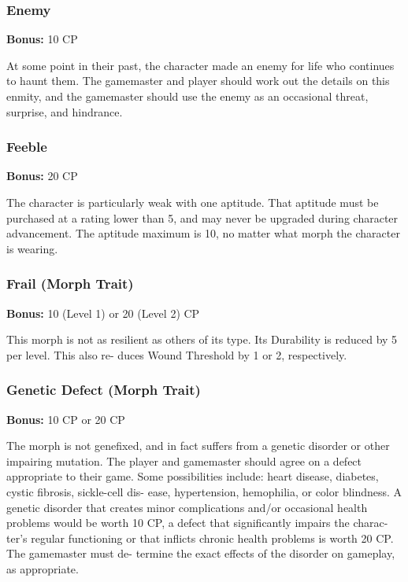 \subsubsection{Enemy}

\textbf{Bonus:} 10 CP

At some point in their past, the character made 
an enemy for life who continues to haunt them. The 
gamemaster and player should work out the details on 
this enmity, and the gamemaster should use the enemy 
as an occasional threat, surprise, and hindrance.

\subsubsection{Feeble}

\textbf{Bonus:} 20 CP

The character is particularly weak with one aptitude. 
That aptitude must be purchased at a rating lower 
than 5, and may never be upgraded during character 
advancement. The aptitude maximum is 10, no matter 
what morph the character is wearing.

\subsubsection{Frail (Morph Trait)}

\textbf{Bonus:} 10 (Level 1) or 20 (Level 2) CP

This morph is not as resilient as others of its type. 
Its Durability is reduced by 5 per level. This also re-
duces Wound Threshold by 1 or 2, respectively.

\subsubsection{Genetic Defect (Morph Trait)}

\textbf{Bonus:} 10 CP or 20 CP

The morph is not genefixed, and in fact suffers 
from a genetic disorder or other impairing mutation. 
The player and gamemaster should agree on a defect 
appropriate to their game. Some possibilities include: 
heart disease, diabetes, cystic fibrosis, sickle-cell dis-
ease, hypertension, hemophilia, or color blindness. 
A genetic disorder that creates minor complications 
and/or occasional health problems would be worth 
10 CP, a defect that significantly impairs the charac-
ter's regular functioning or that inflicts chronic health 
problems is worth 20 CP. The gamemaster must de-
termine the exact effects of the disorder on gameplay, 
as appropriate.

